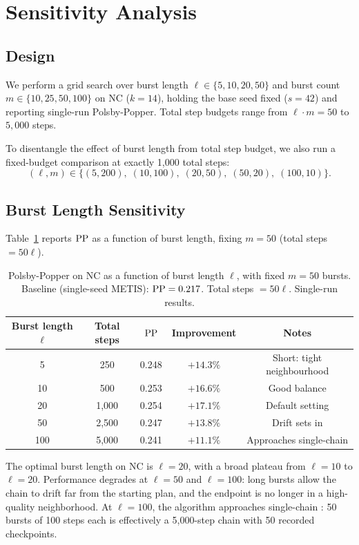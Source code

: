 \section{Sensitivity Analysis}
\label{sec:sensitivity}

\subsection{Design}

We perform a grid search over burst length $\ell \in \{5, 10, 20, 50\}$
and burst count $m \in \{10, 25, 50, 100\}$ on NC ($k = 14$),
holding the base seed fixed ($s = 42$) and reporting single-run
Polsby-Popper.
Total step budgets range from $\ell \cdot m = 50$ to $5{,}000$ steps.

To disentangle the effect of burst length from total step budget,
we also run a fixed-budget comparison at exactly 1{,}000 total steps:
\[
  (\ell, m) \in \{(5, 200),\; (10, 100),\; (20, 50),\; (50, 20),\; (100, 10)\}.
\]

\subsection{Burst Length Sensitivity}

Table~\ref{tab:burst-length} reports $\mathrm{PP}$ as a function of burst length,
fixing $m = 50$ (total steps $= 50\ell$).

\begin{table}[h]
\centering
\caption{Polsby-Popper on NC as a function of burst length $\ell$,
         with fixed $m = 50$ bursts. Baseline (single-seed METIS): $\mathrm{PP} = 0.217$.
         Total steps $= 50\ell$. Single-run results.}
\label{tab:burst-length}
\begin{tabular}{ccccc}
\toprule
Burst length $\ell$ & Total steps & $\mathrm{PP}$ & Improvement & Notes \\
\midrule
5   &   250 & 0.248 & $+14.3\%$ & Short: tight neighbourhood \\
10  &   500 & 0.253 & $+16.6\%$ & Good balance \\
20  & 1{,}000 & 0.254 & $+17.1\%$ & Default setting \\
50  & 2{,}500 & 0.247 & $+13.8\%$ & Drift sets in \\
100 & 5{,}000 & 0.241 & $+11.1\%$ & Approaches single-chain \recom{} \\
\bottomrule
\end{tabular}
\end{table}

The optimal burst length on NC is $\ell = 20$, with a broad plateau
from $\ell = 10$ to $\ell = 20$.
Performance degrades at $\ell = 50$ and $\ell = 100$: long bursts allow
the chain to drift far from the starting plan, and the endpoint is no
longer in a high-quality neighborhood.
At $\ell = 100$, the algorithm approaches single-chain \recom{}:
50 bursts of 100 steps each is effectively a 5{,}000-step chain with
50 recorded checkpoints.

